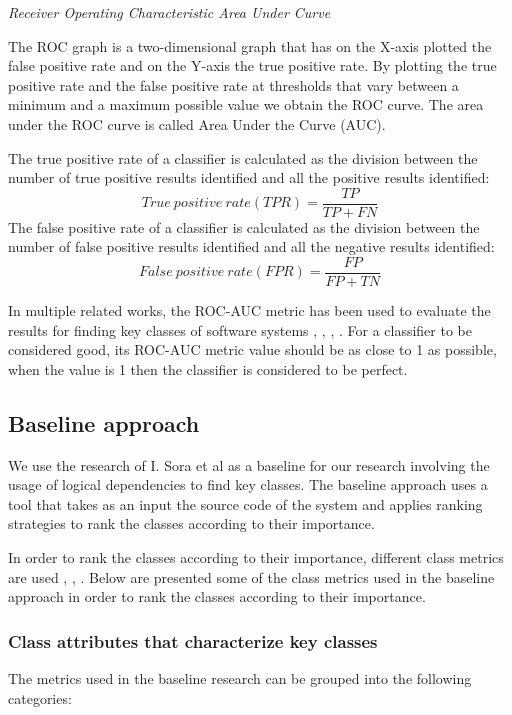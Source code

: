 \documentclass[12pt]{mitthesis}
\begin{document}
\textit{Receiver Operating Characteristic Area Under Curve}


The ROC graph is a two-dimensional graph that has on the X-axis plotted the false positive rate and on the Y-axis the true positive rate. By plotting the true positive rate and the false positive rate at thresholds that vary between a minimum and a maximum possible value we obtain the ROC curve. The area under the ROC curve is called Area Under the Curve (AUC).

The true positive rate of a classifier is calculated as the division between the number of true positive results identified and all the positive results identified:
\[ True\ positive\ rate (TPR)
  = \dfrac{TP}{TP+FN}
\]
The false positive rate of a classifier is calculated as the division between the number of false positive results identified and all the negative results identified:
\[ False\ positive\ rate (FPR)
  = \dfrac{FP}{FP+TN}
\]


In multiple related works, the ROC-AUC metric has been used to evaluate the results for finding key classes of software systems \cite{6676885}, \cite{Finding-key-classes}, \cite{rocclasification}, \cite{7551990}.
For a classifier to be considered good, its ROC-AUC metric value should be as close to 1 as possible, when the value is 1 then the classifier is considered to be perfect.


\subsection{Baseline approach}
\label{sec:previous_measurements}

We use the research of I. Sora et al \cite{Finding-key-classes} as a baseline for our research involving the usage of logical dependencies to find key classes. 
The baseline approach uses a tool that takes as an input the source code of the system and applies ranking strategies to rank the classes according to their importance. 

In order to rank the classes according to their importance, different class metrics are used \cite{Ding2016AnIA}, \cite{ZaidmanJurnal}, \cite{PAN2018188}. Below are presented some of the class metrics used in the baseline approach in order to rank the classes according to their importance.



\subsubsection{Class attributes that characterize key classes}
The metrics used in the baseline research can be grouped into the following categories: 
\end{document}
